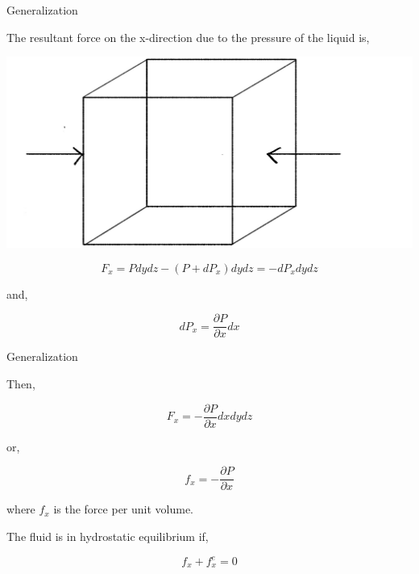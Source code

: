 \documentclass[]{beamer}
\begin{document}
\begin{frame}
  \textcolor{mypink1}{Generalization}
  \vspace{5mm}

The resultant force on the x-direction due to the pressure of the liquid is,


 \begin{center}
  \includegraphics[height=1.in]{images2/generalization1.jpg}
\end{center}

\pause
\begin{equation*}
F_x=Pdydz-(P+dP_x)dydz=-dP_xdydz
\end{equation*}

\pause

and, 

\begin{equation*}
dP_x=\frac{\partial P}{\partial x}dx
\end{equation*}




  \end{frame}




\begin{frame}
  \textcolor{mypink1}{Generalization}
  \vspace{5mm}

Then, 

\begin{equation*}
F_x=-\frac{\partial P}{\partial x}dxdydz
\end{equation*}

or,


\begin{equation*}
f_x=-\frac{\partial P}{\partial x}
\end{equation*}

where $f_x$ is the force per unit volume.
\vspace{3mm}

\pause

The fluid is in hydrostatic equilibrium if,


\begin{equation*}
f_x+f^{e}_x=0
\end{equation*}



  \end{frame}
\end{document}
